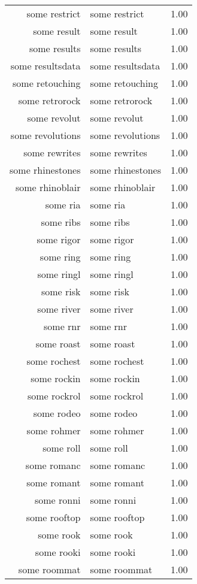\begin{table}[ht]
\begin{tabular}{rlr}
  some restrict & some restrict & 1.00 \\ 
  some result & some result & 1.00 \\ 
  some results & some results & 1.00 \\ 
  some resultsdata & some resultsdata & 1.00 \\ 
  some retouching & some retouching & 1.00 \\ 
  some retrorock & some retrorock & 1.00 \\ 
  some revolut & some revolut & 1.00 \\ 
  some revolutions & some revolutions & 1.00 \\ 
  some rewrites & some rewrites & 1.00 \\ 
  some rhinestones & some rhinestones & 1.00 \\ 
  some rhinoblair & some rhinoblair & 1.00 \\ 
  some ria & some ria & 1.00 \\ 
  some ribs & some ribs & 1.00 \\ 
  some rigor & some rigor & 1.00 \\ 
  some ring & some ring & 1.00 \\ 
  some ringl & some ringl & 1.00 \\ 
  some risk & some risk & 1.00 \\ 
  some river & some river & 1.00 \\ 
  some rnr & some rnr & 1.00 \\ 
  some roast & some roast & 1.00 \\ 
  some rochest & some rochest & 1.00 \\ 
  some rockin & some rockin & 1.00 \\ 
  some rockrol & some rockrol & 1.00 \\ 
  some rodeo & some rodeo & 1.00 \\ 
  some rohmer & some rohmer & 1.00 \\ 
  some roll & some roll & 1.00 \\ 
  some romanc & some romanc & 1.00 \\ 
  some romant & some romant & 1.00 \\ 
  some ronni & some ronni & 1.00 \\ 
  some rooftop & some rooftop & 1.00 \\ 
  some rook & some rook & 1.00 \\ 
  some rooki & some rooki & 1.00 \\ 
  some roommat & some roommat & 1.00 \\ 

\end{tabular}
\end{table}
